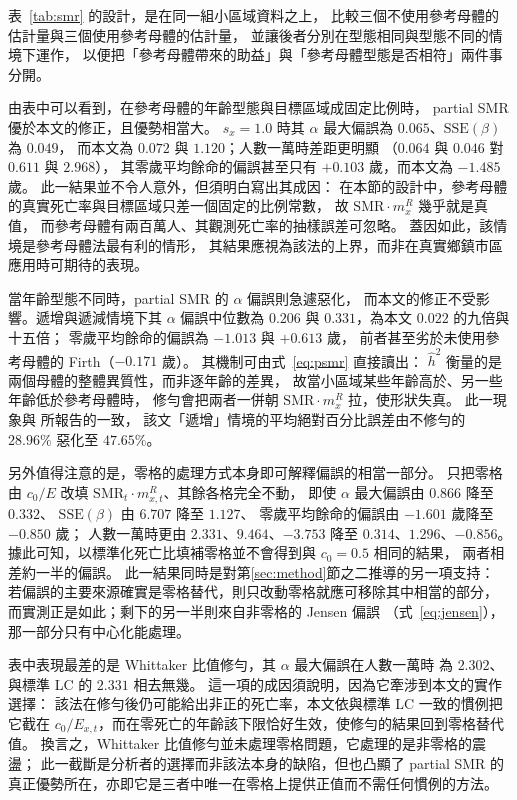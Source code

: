 \documentclass[UTF8, fontset=macnew, a4paper, 12pt]{ctexart}
\begin{document}
表~\ref{tab:smr} 的設計，是在同一組小區域資料之上，
比較三個不使用參考母體的估計量與三個使用參考母體的估計量，
並讓後者分別在型態相同與型態不同的情境下運作，
以便把「參考母體帶來的助益」與「參考母體型態是否相符」兩件事分開。

由表中可以看到，在參考母體的年齡型態與目標區域成固定比例時，
partial SMR 優於本文的修正，且優勢相當大。
$s_x=1.0$ 時其 $\alpha$ 最大偏誤為 $0.065$、$\mathrm{SSE}(\beta)$ 為 $0.049$，
而本文為 $0.072$ 與 $1.120$；人數一萬時差距更明顯
（$0.064$ 與 $0.046$ 對 $0.611$ 與 $2.968$），
其零歲平均餘命的偏誤甚至只有 $+0.103$ 歲，而本文為 $-1.485$ 歲。
此一結果並不令人意外，但須明白寫出其成因：
在本節的設計中，參考母體的真實死亡率與目標區域只差一個固定的比例常數，
故 $\mathrm{SMR}\cdot m^{R}_x$ 幾乎就是真值，
而參考母體有兩百萬人、其觀測死亡率的抽樣誤差可忽略。
蓋因如此，該情境是參考母體法最有利的情形，
其結果應視為該法的上界，而非在真實鄉鎮市區應用時可期待的表現。

當年齡型態不同時，partial SMR 的 $\alpha$ 偏誤則急遽惡化，
而本文的修正不受影響。遞增與遞減情境下其 $\alpha$ 偏誤中位數為
$0.206$ 與 $0.331$，為本文 $0.022$ 的九倍與十五倍；
零歲平均餘命的偏誤為 $-1.013$ 與 $+0.613$ 歲，
前者甚至劣於未使用參考母體的 Firth（$-0.171$ 歲）。
其機制可由式~\eqref{eq:psmr} 直接讀出：
$\hat h^2$ 衡量的是兩個母體的整體異質性，而非逐年齡的差異，
故當小區域某些年齡高於、另一些年齡低於參考母體時，
修勻會把兩者一併朝 $\mathrm{SMR}\cdot m^{R}_x$ 拉，使形狀失真。
此一現象與 \citet[Table 1]{yue2019}所報告的一致，
該文「遞增」情境的平均絕對百分比誤差由不修勻的 $28.96\%$ 惡化至 $47.65\%$。

另外值得注意的是，零格的處理方式本身即可解釋偏誤的相當一部分。
只把零格由 $c_0/E$ 改填 $\mathrm{SMR}_t\cdot m^{R}_{x,t}$、其餘各格完全不動，
即使 $\alpha$ 最大偏誤由 $0.866$ 降至 $0.332$、
$\mathrm{SSE}(\beta)$ 由 $6.707$ 降至 $1.127$、
零歲平均餘命的偏誤由 $-1.601$ 歲降至 $-0.850$ 歲；
人數一萬時更由 $2.331$、$9.464$、$-3.753$ 降至 $0.314$、$1.296$、$-0.856$。
據此可知，以標準化死亡比填補零格並不會得到與 $c_0=0.5$ 相同的結果，
兩者相差約一半的偏誤。
此一結果同時是對第\ref{sec:method}節之二推導的另一項支持：
若偏誤的主要來源確實是零格替代，則只改動零格就應可移除其中相當的部分，
而實測正是如此；剩下的另一半則來自非零格的 Jensen 偏誤
（式~\eqref{eq:jensen}），那一部分只有中心化能處理。

表中表現最差的是 Whittaker 比值修勻，其 $\alpha$ 最大偏誤在人數一萬時
為 $2.302$、與標準 LC 的 $2.331$ 相去無幾。
這一項的成因須說明，因為它牽涉到本文的實作選擇：
該法在修勻後仍可能給出非正的死亡率，本文依與標準 LC 一致的慣例把它截在
$c_0/E_{x,t}$，而在零死亡的年齡該下限恰好生效，使修勻的結果回到零格替代值。
換言之，Whittaker 比值修勻並未處理零格問題，它處理的是非零格的震盪；
此一截斷是分析者的選擇而非該法本身的缺陷，但也凸顯了 partial SMR 的
真正優勢所在，亦即它是三者中唯一在零格上提供正值而不需任何慣例的方法。
\end{document}
